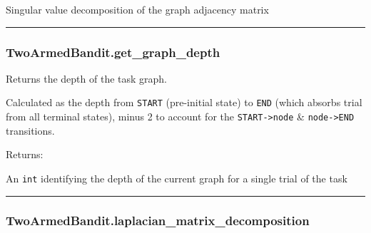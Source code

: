 \begin{Shaded}
\begin{Highlighting}[]
\NormalTok{)}
\end{Highlighting}
\end{Shaded}

Singular value decomposition of the graph adjacency matrix

\begin{center}\rule{0.5\linewidth}{\linethickness}\end{center}

\subsubsection{TwoArmedBandit.get\_graph\_depth}\label{twoarmedbandit.get_graph_depth}

\begin{Shaded}
\begin{Highlighting}[]
\NormalTok{)}
\end{Highlighting}
\end{Shaded}

Returns the depth of the task graph.

Calculated as the depth from \texttt{START} (pre-initial state) to
\texttt{END} (which absorbs trial from all terminal states), minus 2 to
account for the \texttt{START-\textgreater{}node} \&
\texttt{node-\textgreater{}END} transitions.

Returns:

An \texttt{int} identifying the depth of the current graph for a single
trial of the task

\begin{center}\rule{0.5\linewidth}{\linethickness}\end{center}

\subsubsection{TwoArmedBandit.laplacian\_matrix\_decomposition}\label{twoarmedbandit.laplacian_matrix_decomposition}

\begin{Shaded}
\begin{Highlighting}[]
\NormalTok{)}
\end{Highlighting}
\end{Shaded}

